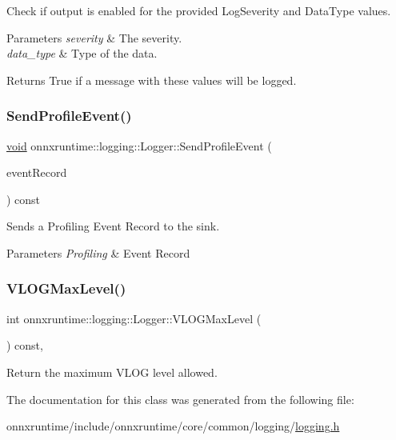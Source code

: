 Check if output is enabled for the provided Log\+Severity and Data\+Type values. 
\begin{DoxyParams}{Parameters}
{\em severity} & The severity. \\
\hline
{\em data\+\_\+type} & Type of the data. \\
\hline
\end{DoxyParams}
\begin{DoxyReturn}{Returns}
True if a message with these values will be logged. 
\end{DoxyReturn}
\mbox{\label{classonnxruntime_1_1logging_1_1Logger_a7057a0099074535ab5da7ca57b061a28}} 
\subsubsection{\texorpdfstring{Send\+Profile\+Event()}{SendProfileEvent()}}
{\footnotesize\ttfamily \mbox{\hyperlink{mlasi_8h_a88f941d423cb2a819b70a1358982b1a6}{void}} onnxruntime\+::logging\+::\+Logger\+::\+Send\+Profile\+Event (\begin{DoxyParamCaption}\item[{\mbox{\hyperlink{structonnxruntime_1_1profiling_1_1EventRecord}{profiling\+::\+Event\+Record}} \&}]{event\+Record }\end{DoxyParamCaption}) const\hspace{0.3cm}{\ttfamily [inline]}}

Sends a Profiling Event Record to the sink. 
\begin{DoxyParams}{Parameters}
{\em Profiling} & Event Record \\
\hline
\end{DoxyParams}
\mbox{\label{classonnxruntime_1_1logging_1_1Logger_af2e3439096494a094a9780eb2e238c95}} 
\subsubsection{\texorpdfstring{V\+L\+O\+G\+Max\+Level()}{VLOGMaxLevel()}}
{\footnotesize\ttfamily int onnxruntime\+::logging\+::\+Logger\+::\+V\+L\+O\+G\+Max\+Level (\begin{DoxyParamCaption}{ }\end{DoxyParamCaption}) const\hspace{0.3cm}{\ttfamily [inline]}, {\ttfamily [noexcept]}}

Return the maximum V\+L\+OG level allowed. 

The documentation for this class was generated from the following file\+:\begin{DoxyCompactItemize}
\item 
onnxruntime/include/onnxruntime/core/common/logging/\mbox{\hyperlink{logging_8h}{logging.\+h}}\end{DoxyCompactItemize}
